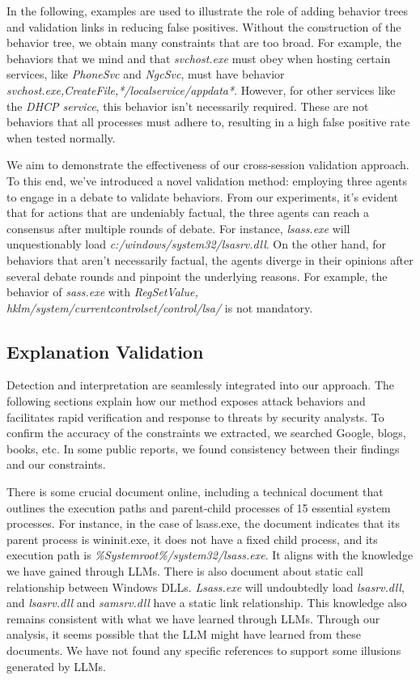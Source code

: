 In the following, examples are used to illustrate the role of adding behavior trees and validation links in reducing false positives.
Without the construction of the behavior tree, we obtain many constraints that are too broad.
For example, the behaviors that we mind and that \textit{svchost.exe} must obey when hosting certain services, like \textit{PhoneSvc} and \textit{NgcSvc}, must have behavior \textit{svchost.exe,CreateFile,*/localservice/appdata*}. However, for other services like the \textit{DHCP service}, this behavior isn't necessarily required.
These are not behaviors that all processes must adhere to, resulting in a high false positive rate when tested normally. 

We aim to demonstrate the effectiveness of our cross-session validation approach. To this end, we've introduced a novel validation method: employing three agents to engage in a debate to validate behaviors. From our experiments, it's evident that for actions that are undeniably factual, the three agents can reach a consensus after multiple rounds of debate. For instance, \textit{lsass.exe} will unquestionably load \textit{c:/windows/system32/lsasrv.dll}. On the other hand, for behaviors that aren't necessarily factual, the agents diverge in their opinions after several debate rounds and pinpoint the underlying reasons. For example, the behavior of \textit{sass.exe} with \textit{RegSetValue, hklm/system/currentcontrolset/control/lsa/} is not mandatory.



\subsection{Explanation Validation}
\label{sec-explanation-val}

Detection and interpretation are seamlessly integrated into our approach. The following sections explain how our method exposes attack behaviors and facilitates rapid verification and response to threats by security analysts.
To confirm the accuracy of the constraints we extracted, we searched Google, blogs, books, etc. In some public reports, we found consistency between their findings and our constraints.

There is some crucial document online\cite{nasbench}, including a technical document that outlines the execution paths and parent-child processes of 15 essential system processes. For instance, in the case of lsass.exe, the document indicates that its parent process is wininit.exe, it does not have a fixed child process, and its execution path is \textit{\%Systemroot\%/system32/lsass.exe}. It aligns with the knowledge we have gained through LLMs.
There is also document\cite{windows10dll} about static call relationship between Windows DLLs. \textit{Lsass.exe} will undoubtedly load \textit{lsasrv.dll}, and \textit{lsasrv.dll} and \textit{samsrv.dll} have a static link relationship. This knowledge also remains consistent with what we have learned through LLMs.
Through our analysis, it seems possible that the LLM might have learned from these documents. We have not found any specific references to support some illusions generated by LLMs.


